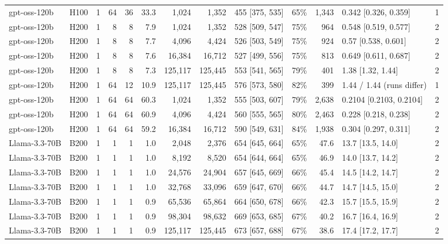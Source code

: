 \begin{landscape}
\begin{longtable}{llrrrrrrlrrlr}
gpt-oss-120b & H100 & 1 & 64 & 36 & 33.3 & 1,024 & 1,352 & 455 {[}375, 535{]} & 65\% & 1,343 & 0.342 {[}0.326, 0.359{]} & 1 \\
gpt-oss-120b & H200 & 1 & 8 & 8 & 7.9 & 1,024 & 1,352 & 528 {[}509, 547{]} & 75\% & 964 & 0.548 {[}0.519, 0.577{]} & 2 \\
gpt-oss-120b & H200 & 1 & 8 & 8 & 7.7 & 4,096 & 4,424 & 526 {[}503, 549{]} & 75\% & 924 & 0.57 {[}0.538, 0.601{]} & 2 \\
gpt-oss-120b & H200 & 1 & 8 & 8 & 7.6 & 16,384 & 16,712 & 527 {[}499, 556{]} & 75\% & 813 & 0.649 {[}0.611, 0.687{]} & 2 \\
gpt-oss-120b & H200 & 1 & 8 & 8 & 7.3 & 125,117 & 125,445 & 553 {[}541, 565{]} & 79\% & 401 & 1.38 {[}1.32, 1.44{]} & 2 \\
gpt-oss-120b & H200 & 1 & 64 & 12 & 10.9 & 125,117 & 125,445 & 576 {[}573, 580{]} & 82\% & 399 & 1.44 / 1.44 (runs differ) & 1 \\
gpt-oss-120b & H200 & 1 & 64 & 64 & 60.3 & 1,024 & 1,352 & 555 {[}503, 607{]} & 79\% & 2,638 & 0.2104 {[}0.2103, 0.2104{]} & 2 \\
gpt-oss-120b & H200 & 1 & 64 & 64 & 60.9 & 4,096 & 4,424 & 560 {[}555, 565{]} & 80\% & 2,463 & 0.228 {[}0.218, 0.238{]} & 2 \\
gpt-oss-120b & H200 & 1 & 64 & 64 & 59.2 & 16,384 & 16,712 & 590 {[}549, 631{]} & 84\% & 1,938 & 0.304 {[}0.297, 0.311{]} & 2 \\
Llama-3.3-70B & B200 & 1 & 1 & 1 & 1.0 & 2,048 & 2,376 & 654 {[}645, 664{]} & 65\% & 47.6 & 13.7 {[}13.5, 14.0{]} & 2 \\
Llama-3.3-70B & B200 & 1 & 1 & 1 & 1.0 & 8,192 & 8,520 & 654 {[}644, 664{]} & 65\% & 46.9 & 14.0 {[}13.7, 14.2{]} & 2 \\
Llama-3.3-70B & B200 & 1 & 1 & 1 & 1.0 & 24,576 & 24,904 & 657 {[}645, 669{]} & 66\% & 45.4 & 14.5 {[}14.2, 14.7{]} & 2 \\
Llama-3.3-70B & B200 & 1 & 1 & 1 & 1.0 & 32,768 & 33,096 & 659 {[}647, 670{]} & 66\% & 44.7 & 14.7 {[}14.5, 15.0{]} & 2 \\
Llama-3.3-70B & B200 & 1 & 1 & 1 & 0.9 & 65,536 & 65,864 & 664 {[}650, 678{]} & 66\% & 42.3 & 15.7 {[}15.5, 15.9{]} & 2 \\
Llama-3.3-70B & B200 & 1 & 1 & 1 & 0.9 & 98,304 & 98,632 & 669 {[}653, 685{]} & 67\% & 40.2 & 16.7 {[}16.4, 16.9{]} & 2 \\
Llama-3.3-70B & B200 & 1 & 1 & 1 & 0.9 & 125,117 & 125,445 & 673 {[}657, 688{]} & 67\% & 38.6 & 17.4 {[}17.2, 17.7{]} & 2 \\

\end{longtable}
\end{landscape}
